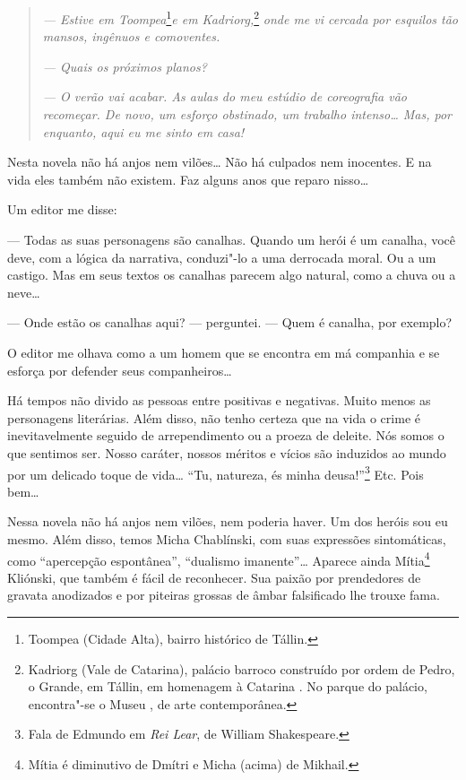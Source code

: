 \begin{quotation}
\emph{--- Estive em Toompea}\footnote{Toompea (Cidade Alta), bairro
  histórico de Tállin.}\emph{e em Kadriorg,}\footnote{Kadriorg (Vale de
  Catarina), palácio barroco construído por ordem de Pedro, o Grande, em
  Tállin, em homenagem à Catarina . No parque do palácio, encontra"-se o
  Museu , de arte contemporânea.} \emph{onde me vi cercada por
esquilos tão mansos, ingênuos e comoventes.}

\emph{--- Quais os próximos planos?}

\emph{--- O verão vai acabar. As aulas do meu estúdio de coreografia vão
recomeçar. De novo, um esforço obstinado, um trabalho intenso\ldots{} Mas,
por enquanto, aqui eu me sinto em casa!}
\end{quotation}

Nesta novela não há anjos nem vilões\ldots{} Não há culpados nem inocentes. E
na vida eles também não existem. Faz alguns anos que reparo nisso\ldots{}

Um editor me disse:

--- Todas as suas personagens são canalhas. Quando um herói é um
canalha, você deve, com a lógica da narrativa, conduzi"-lo a uma
derrocada moral. Ou a um castigo. Mas em seus textos os canalhas
parecem algo natural, como a chuva ou a neve\ldots{}

--- Onde estão os canalhas aqui? --- perguntei. --- Quem é canalha, por
exemplo?

O editor me olhava como a um homem que se encontra em má companhia e se
esforça por defender seus companheiros\ldots{}

Há tempos não divido as pessoas entre positivas e negativas. Muito menos
as personagens literárias. Além disso, não tenho certeza que na vida o
crime é inevitavelmente seguido de arrependimento ou a proeza de
deleite. Nós somos o que sentimos ser. Nosso caráter, nossos méritos e
vícios são induzidos ao mundo por um delicado toque de vida\ldots{} ``Tu,
natureza, és minha deusa!''\footnote{Fala de Edmundo em \emph{Rei Lear},
  de William Shakespeare.} Etc. Pois bem\ldots{}

Nessa novela não há anjos nem vilões, nem poderia haver. Um dos heróis
sou eu mesmo. Além disso, temos Micha Chablínski, com suas expressões
sintomáticas, como ``apercepção espontânea'', ``dualismo imanente''\ldots{}
Aparece ainda Mítia\footnote{Mítia é diminutivo de Dmítri e Micha
  (acima) de Mikhail.} Kliónski, que também é fácil de reconhecer. Sua
paixão por prendedores de gravata anodizados e por piteiras grossas de
âmbar falsificado lhe trouxe fama.

